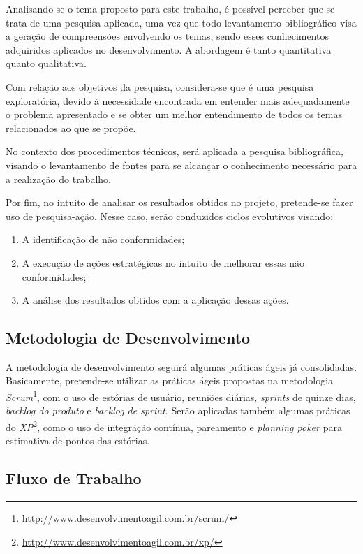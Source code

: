 Analisando-se o tema proposto para este trabalho, é possível perceber que se trata de uma pesquisa aplicada, uma vez que todo levantamento bibliográfico visa a geração de compreensões envolvendo os temas, sendo esses conhecimentos adquiridos aplicados no desenvolvimento. A abordagem é tanto quantitativa quanto qualitativa.

Com relação aos objetivos da pesquisa, considera-se que é uma pesquisa exploratória, devido à necessidade encontrada em entender mais adequadamente o problema apresentado e se obter um melhor entendimento de todos os temas relacionados ao que se propõe.

No contexto dos procedimentos técnicos, será aplicada a pesquisa bibliográfica, visando o levantamento de fontes para se alcançar o conhecimento necessário para a realização do trabalho.

Por fim, no intuito de analisar os resultados obtidos no projeto, pretende-se fazer uso de pesquisa-ação. Nesse caso, serão conduzidos ciclos evolutivos visando:

\begin{enumerate}
	\item A identificação de não conformidades;
	\item A execução de ações estratégicas no intuito de melhorar essas não conformidades;
	\item A  análise dos resultados obtidos com a aplicação dessas ações.
\end{enumerate}

\subsection{Metodologia de Desenvolvimento}

A metodologia de desenvolvimento seguirá algumas práticas ágeis já consolidadas. Basicamente, pretende-se utilizar as práticas ágeis propostas na metodologia \textit{Scrum}\footnote{\url{http://www.desenvolvimentoagil.com.br/scrum/}}, com o uso de estórias de usuário, reuniões diárias, \textit{sprints} de quinze dias, \textit{backlog do produto} e \textit{backlog de sprint}. Serão aplicadas também algumas práticas do \textit{XP}\footnote{\url{http://www.desenvolvimentoagil.com.br/xp/}}, como o uso de integração contínua, pareamento e \textit{planning poker} para estimativa de pontos das estórias.

\subsection{Fluxo de Trabalho}

